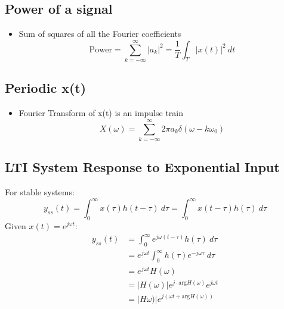 \documentclass[a4paper]{article}
\begin{document}
\subsection{Power of a signal}
\begin{itemize}
    \item Sum of squares of all the Fourier coefficients
    $$\text{Power} = \sum_{k=-\infty}^{\infty}|a_k|^2 = \frac{1}{T}\int_T |x(t)|^2 \ dt$$
\end{itemize}

\subsection{Periodic x(t)}
\begin{itemize}
    \item Fourier Transform of x(t) is an impulse train
    $$X(\omega) = \sum_{k=-\infty}^{\infty}2\pi a_k \delta(\omega -k\omega_0)$$
\end{itemize}

\subsection{LTI System Response to Exponential Input}
For stable systems:
$$y_{ss}(t) = \int_0^\infty x(\tau)h(t-\tau)\ d\tau = \int_0^\infty x(t-\tau)h(\tau)\ d\tau$$
Given $x(t) = e^{j\omega t}$:
\begin{align*}
    y_{ss}(t) &= \int_0^\infty e^{j\omega(t-\tau)} h(\tau)\ d\tau\\
    &= e^{j\omega t}\int_0^\infty h(\tau) e^{-j\omega\tau}\ d\tau\\
    &= e^{j\omega t}H(\omega)\\
    &= |H(\omega)|e^{j\cdot\text{arg}H(\omega)}e^{j\omega t}\\
    &= |H\omega)|e^{j(\omega t+\text{arg}H(\omega))}
\end{align*}
\end{document}

